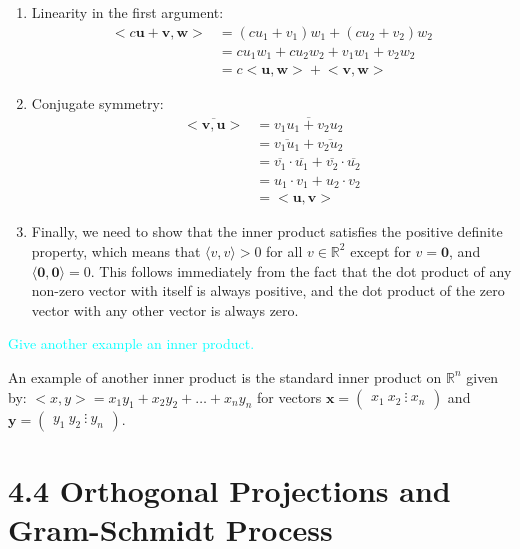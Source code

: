 \documentclass[fontsize=12pt]{scrartcl}
\begin{document}
\begin{enumerate}
	\item Linearity in the first argument:
\begin{align*}
\big< c \mathbf{u} + \mathbf{v}, \mathbf{w} \big> &= (c u_1 + v_1) w_1 + (c u_2 + v_2) w_2 \\
&= c u_1 w_1 + c u_2 w_2 + v_1 w_1 + v_2 w_2 \\
&= c \big< \mathbf{u}, \mathbf{w} \big> + \big< \mathbf{v}, \mathbf{w} \big>
\end{align*}
	\item Conjugate symmetry:
\begin{align*}
\overline{\big< \mathbf{v}, \mathbf{u} \big>} &= \overline{v_1 u_1 + v_2 u_2} \\
&= \overline{v_1 u_1} + \overline{v_2 u_2} \\
&= \overline{v_1} \cdot \overline{u_1} + \overline{v_2} \cdot \overline{u_2} \\
&= u_1 \cdot v_1 + u_2 \cdot v_2 \\
&= \big< \mathbf{u}, \mathbf{v} \big>
\end{align*}
	\item Finally, we need to show that the inner product satisfies the positive definite property, which means that $\langle v, v \rangle > 0$ for all $v \in \mathbb{R}^2$ except for $v = \mathbf{0}$, and $\langle \mathbf{0}, \mathbf{0} \rangle = 0$. This follows immediately from the fact that the dot product of any non-zero vector with itself is always positive, and the dot product of the zero vector with any other vector is always zero.
\end{enumerate}

\noindent
\textcolor{cyan}{Give another example an inner product.}

\noindent
An example of another inner product is the standard inner product on $\mathbb{R}^n$ given by: $<x, y> = x_1y_1+ x_2y_2 + \ldots + x_ny_n $ for vectors $\mathbf{x} = \begin{pmatrix}x_1 \ x_2 \ \vdots \ x_n\end{pmatrix}$ and $\mathbf{y} = \begin{pmatrix}y_1 \ y_2 \ \vdots \ y_n\end{pmatrix}$.

\newpage

\section{4.4 Orthogonal Projections and Gram-Schmidt Process}
\end{document}
